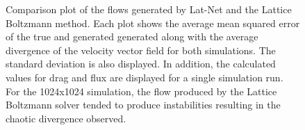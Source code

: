 \documentclass{article}
\begin{document}
\begin{figure}[!t]
\caption{ Comparison plot of the flows generated by Lat-Net and the Lattice Boltzmann method. Each plot shows the average mean squared error of the true and generated generated along with the average divergence of the velocity vector field for both simulations. The standard deviation is also displayed. In addition, the calculated values for drag and flux are displayed for a single simulation run. For the 1024x1024 simulation, the flow produced by the Lattice Boltzmann solver tended to produce instabilities resulting in the chaotic divergence observed.}
\label{2d_error_plot}
\end{figure}
\end{document}
